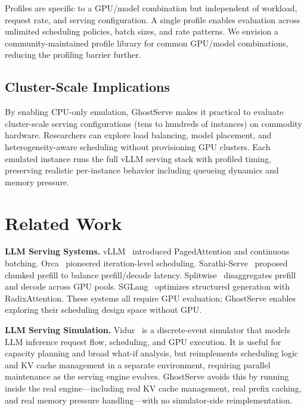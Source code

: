 \documentclass[conference]{IEEEtran}
\newcommand{\sysname}{GhostServe}
\begin{document}
Profiles are specific to a GPU/model combination but independent of workload, request rate, and serving configuration. A single profile enables evaluation across unlimited scheduling policies, batch sizes, and rate patterns. We envision a community-maintained profile library for common GPU/model combinations, reducing the profiling barrier further.

\subsection{Cluster-Scale Implications}

By enabling CPU-only emulation, \sysname{} makes it practical to evaluate cluster-scale serving configurations (tens to hundreds of instances) on commodity hardware. Researchers can explore load balancing, model placement, and heterogeneity-aware scheduling without provisioning GPU clusters. Each emulated instance runs the full vLLM serving stack with profiled timing, preserving realistic per-instance behavior including queueing dynamics and memory pressure.

\section{Related Work}

\textbf{LLM Serving Systems.} vLLM~\cite{kwon2023vllm} introduced PagedAttention and continuous batching. Orca~\cite{yu2022orca} pioneered iteration-level scheduling. Sarathi-Serve~\cite{agrawal2024sarathi} proposed chunked prefill to balance prefill/decode latency. Splitwise~\cite{patel2024splitwise} disaggregates prefill and decode across GPU pools. SGLang~\cite{zheng2024sglang} optimizes structured generation with RadixAttention. These systems all require GPU evaluation; \sysname{} enables exploring their scheduling design space without GPU.

\textbf{LLM Serving Simulation.} Vidur~\cite{agrawal2024vidur} is a discrete-event simulator that models LLM inference request flow, scheduling, and GPU execution. It is useful for capacity planning and broad what-if analysis, but reimplements scheduling logic and KV cache management in a separate environment, requiring parallel maintenance as the serving engine evolves. \sysname{} avoids this by running inside the real engine---including real KV cache management, real prefix caching, and real memory pressure handling---with no simulator-side reimplementation.
\end{document}
